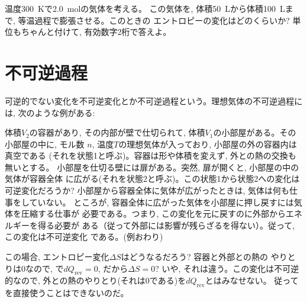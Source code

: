 
\begin{q}\label{q:entropy_isothermal2} 温度300~Kで2.0~molの気体を考える。
この気体を, 体積50~Lから体積100~Lまで, 等温過程で膨張させる。このときの
エントロピーの変化はどのくらいか? 単位もちゃんと付けて, 有効数字2桁で答えよ。
\end{q}\mv


\section{不可逆過程}

可逆的でない変化を不可逆変化とか不可逆過程という。理想気体の不可逆過程には, 
次のような例がある:

\begin{exmpl}\label{exmpl:gas_expand_irr} 体積$V_2$の容器があり, 
その内部が壁で仕切られて, 体積$V_1$の小部屋がある。その小部屋の中に, モル数
$n$, 温度$T$の理想気体が入っており, 小部屋の外の容器内は真空である
(それを状態1と呼ぶ)。容器は形や体積を変えず, 外との熱の交換も無いとする。
小部屋を仕切る壁には扉がある。突然, 扉が開くと, 小部屋の中の気体が容器全体
に広がる(それを状態2と呼ぶ)。この状態1から状態2への変化は可逆変化だろうか?
小部屋から容器全体に気体が広がったときは, 気体は何も仕事をしていない。
ところが, 容器全体に広がった気体を小部屋に押し戻すには気体を圧縮する仕事が
必要である。つまり, この変化を元に戻すのに外部からエネルギーを得る必要が
ある（従って外部には影響が残らざるを得ない）。従って, この変化は不可逆変化
である。(例おわり)
\end{exmpl}

この場合, エントロピー変化$\Delta S$はどうなるだろう? 容器と外部との熱の
やりとりは0なので, で$dQ_{\text{rev}}=0$, 
だから$\Delta S=0$? いや, それは違う。この変化は不可逆的なので, 
外との熱のやりとり(それは0である)を$dQ_{\text{rev}}$とはみなせない。
従ってを直接使うことはできないのだ。

